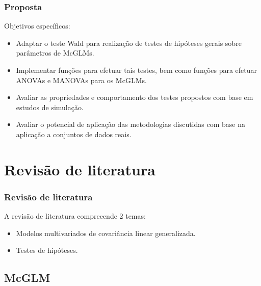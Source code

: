 \documentclass[10pt,
  aspectratio=169,
  serif,
  mathserif,
  professionalfont,
  compress,
  handout,
  ]{beamer}\usepackage[]{graphicx}\usepackage[]{color}
\begin{document}

\begin{frame}
  \frametitle{Proposta}

Objetivos específicos: 

  \begin{itemize}
    \itemsep 2ex

  \item Adaptar o teste Wald para realização de testes de hipóteses gerais sobre parâmetros de McGLMs. 
  
  \item Implementar funções para efetuar tais testes, bem como funções para efetuar ANOVAs e MANOVAs para os McGLMs. 

  \item Avaliar as propriedades e comportamento dos testes propostos com base em estudos de simulação.

  \item Avaliar o potencial de aplicação das metodologias discutidas com base na aplicação a conjuntos de dados reais.

  \end{itemize}

\end{frame}


\section{Revisão de literatura}


\begin{frame}
  \frametitle{Revisão de literatura}
  
  A revisão de literatura compreeende 2 temas:
  
  \begin{itemize}
    \itemsep 2ex
  \item Modelos multivariados de covariância linear generalizada. 
  \item Testes de hipóteses. 
  \end{itemize}
\end{frame}


\subsection{McGLM}
\end{document}
